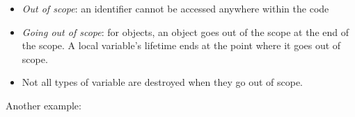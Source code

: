 \documentclass[
  letterpaper,
  DIV=11,
  numbers=noendperiod]{scrreprt}
\providecommand{\tightlist}{%
  \setlength{\itemsep}{0pt}\setlength{\parskip}{0pt}}\usepackage{longtable,booktabs,array}
\begin{document}
\begin{tcolorbox}[enhanced jigsaw, toprule=.15mm, rightrule=.15mm, opacityback=0, breakable, leftrule=.75mm, colback=white, colframe=quarto-callout-note-color-frame, arc=.35mm, left=2mm, bottomrule=.15mm]
\begin{minipage}[t]{5.5mm}
\textcolor{quarto-callout-note-color}{\faInfo}
\end{minipage}%
\begin{minipage}[t]{\textwidth - 5.5mm}

\begin{itemize}
\tightlist
\item
  \emph{Out of scope}: an identifier cannot be accessed anywhere within
  the code
\item
  \emph{Going out of scope}: for objects, an object goes out of the
  scope at the end of the scope. A local variable's lifetime ends at the
  point where it goes out of scope.
\item
  Not all types of variable are destroyed when they go out of scope.
\end{itemize}

\end{minipage}%
\end{tcolorbox}

Another example:
\end{document}
